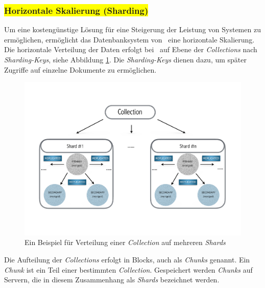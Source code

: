 \subsubsection{\colorbox{yellow}{Horizontale Skalierung (Sharding)}}\label{sharding}
Um eine kostengünstige Lösung für eine Steigerung der Leistung von Systemen zu ermöglichen, ermöglicht das Datenbanksystem von \mongo\  eine horizontale Skalierung. Die horizontale Verteilung der Daten erfolgt bei \mongo\ auf Ebene der \textit{Collections} nach \textit{Sharding-Keys}, siehe Abbildung \ref{img:sharding}. Die \textit{Sharding-Keys} dienen dazu, um später Zugriffe auf einzelne Dokumente zu ermöglichen.
\begin{figure}[H]
\centering
\includegraphics[trim = 0mm 35mm 0mm 30mm, clip, width=1.0\textwidth]{resources/replicaSet/sharding}
\caption[Ein Beispiel für Verteilung einer \textit{Collection} auf mehreren \textit{Shards}]{Ein Beispiel für Verteilung einer \textit{Collection} auf mehreren \textit{Shards}}
\label{img:sharding}
\end{figure}
Die Aufteilung der \textit{Collections} erfolgt in Blocks, auch als \textit{Chunks} genannt. Ein \textit{Chunk} ist ein Teil einer bestimmten \textit{Collection}. Gespeichert werden \textit{Chunks} auf Servern, die in diesem Zusammenhang als \textit{Shards} bezeichnet werden.

